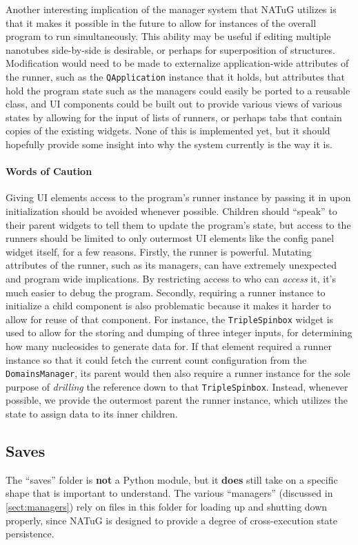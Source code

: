 \documentclass[titlepage]{article}
\begin{document}
	Another interesting implication of the manager system that NATuG utilizes is that it makes it possible in the future to allow for instances of the overall program to run simultaneously. This ability may be useful if editing multiple nanotubes side-by-side is desirable, or perhaps for superposition of structures. Modification would need to be made to externalize application-wide attributes of the runner, such as the \texttt{QApplication} instance that it holds, but attributes that hold the program state such as the managers could easily be ported to a reusable class, and UI components could be built out to provide various views of various states by allowing for the input of lists of runners, or perhaps tabs that contain copies of the existing widgets. None of this is implemented yet, but it should hopefully provide some insight into why the system currently is the way it is.
	
	\paragraph{Words of Caution} Giving UI elements access to the program's runner instance by passing it in upon initialization should be avoided whenever possible. Children should ``speak'' to their parent widgets to tell them to update the program's state, but access to the runners should be limited to only outermost UI elements like the config panel widget itself, for a few reasons. Firstly, the runner is powerful. Mutating attributes of the runner, such as its managers, can have extremely unexpected and program wide implications. By restricting access to who can \textit{access} it, it's much easier to debug the program. Secondly, requiring a runner instance to initialize a child component is also problematic because it makes it harder to allow for reuse of that component. For instance, the \texttt{TripleSpinbox} widget is used to allow for the storing and dumping of three integer inputs, for determining how many nucleosides to generate data for. If that element required a runner instance so that it could fetch the current count configuration from the \texttt{DomainsManager}, its parent would then also require a runner instance for the sole purpose of \textit{drilling} the reference down to that \texttt{TripleSpinbox}. Instead, whenever possible, we provide the outermost parent the runner instance, which utilizes the state to assign data to its inner children.
	
	\subsection{Saves}
	The ``saves'' folder is \textbf{not} a Python module, but it \textbf{does} still take on a specific shape that is important to understand. The various ``managers'' (discussed in \ref{sect:managers}) rely on files in this folder for loading up and shutting down properly, since NATuG is designed to provide a degree of cross-execution state persistence.
	
\end{document}
